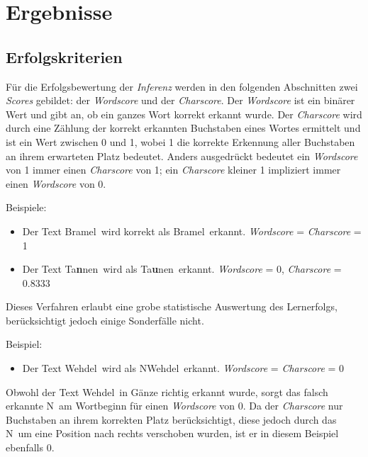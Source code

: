 \section{Ergebnisse}
\label{ergebnisse}

\subsection{Erfolgskriterien}
\label{ergebnisse:erfolg}

Für die Erfolgsbewertung der \textit{Inferenz} werden in den folgenden Abschnitten zwei \textit{Scores} gebildet: der
\textit{Wordscore} und der \textit{Charscore}. Der \textit{Wordscore} ist ein binärer Wert und gibt an, ob ein ganzes
Wort korrekt erkannt wurde. Der \textit{Charscore} wird durch eine Zählung der korrekt erkannten Buchstaben eines
Wortes ermittelt und ist ein Wert zwischen 0 und 1, wobei 1 die korrekte Erkennung aller Buchstaben an ihrem erwarteten
Platz bedeutet. Anders ausgedrückt bedeutet ein \textit{Wordscore} von 1 immer einen \textit{Charscore} von 1; ein
\textit{Charscore} kleiner 1 impliziert immer einen \textit{Wordscore} von 0.

Beispiele:

\begin{itemize}
    \item Der Text \glqq Bramel\grqq\ wird korrekt als \glqq Bramel\grqq\ erkannt. \textit{Wordscore} =
          \textit{Charscore} = 1
      \item Der Text \glqq Ta\textbf{\color{red}n}nen\grqq\ wird als \glqq Ta\textbf{\color{red}u}nen\grqq\ erkannt.
          \textit{Wordscore} = 0, \textit{Charscore} = 0.8333
\end{itemize}

Dieses Verfahren erlaubt eine grobe statistische Auswertung des Lernerfolgs, berücksichtigt jedoch einige Sonderfälle
nicht.

Beispiel:

\begin{itemize}
    \item Der Text \glqq Wehdel\grqq\ wird als \glqq NWehdel\grqq\ erkannt. \textit{Wordscore} = \textit{Charscore} = 0
\end{itemize}

Obwohl der Text \glqq Wehdel\grqq\ in Gänze richtig erkannt wurde, sorgt das falsch erkannte \glqq N\grqq\ am
Wortbeginn für einen \textit{Wordscore} von 0. Da der \textit{Charscore} nur Buchstaben an ihrem korrekten Platz
berücksichtigt, diese jedoch durch das \glqq N\grqq\ um eine Position nach rechts verschoben wurden, ist er in diesem
Beispiel ebenfalls 0.

